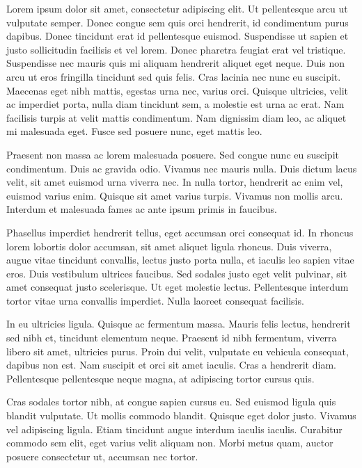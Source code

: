 \newpage
Lorem ipsum dolor sit amet, consectetur adipiscing elit. Ut
pellentesque arcu ut vulputate semper. Donec congue sem quis orci
hendrerit, id condimentum purus dapibus. Donec tincidunt erat id
pellentesque euismod. Suspendisse ut sapien et justo sollicitudin
facilisis et vel lorem. Donec pharetra feugiat erat vel
tristique. Suspendisse nec mauris quis mi aliquam hendrerit aliquet
eget neque. Duis non arcu ut eros fringilla tincidunt sed quis
felis. Cras lacinia nec nunc eu suscipit. Maecenas eget nibh mattis,
egestas urna nec, varius orci. Quisque ultricies, velit ac imperdiet
porta, nulla diam tincidunt sem, a molestie est urna ac erat. Nam
facilisis turpis at velit mattis condimentum. Nam dignissim diam leo,
ac aliquet mi malesuada eget. Fusce sed posuere nunc, eget mattis leo.

Praesent non massa ac lorem malesuada posuere. Sed congue nunc eu
suscipit condimentum. Duis ac gravida odio. Vivamus nec mauris
nulla. Duis dictum lacus velit, sit amet euismod urna viverra nec. In
nulla tortor, hendrerit ac enim vel, euismod varius enim. Quisque sit
amet varius turpis. Vivamus non mollis arcu. Interdum et malesuada
fames ac ante ipsum primis in faucibus.

Phasellus imperdiet hendrerit tellus, eget accumsan orci consequat
id. In rhoncus lorem lobortis dolor accumsan, sit amet aliquet ligula
rhoncus. Duis viverra, augue vitae tincidunt convallis, lectus justo
porta nulla, et iaculis leo sapien vitae eros. Duis vestibulum
ultrices faucibus. Sed sodales justo eget velit pulvinar, sit amet
consequat justo scelerisque. Ut eget molestie lectus. Pellentesque
interdum tortor vitae urna convallis imperdiet. Nulla laoreet
consequat facilisis.

In eu ultricies ligula. Quisque ac fermentum massa. Mauris felis
lectus, hendrerit sed nibh et, tincidunt elementum neque. Praesent id
nibh fermentum, viverra libero sit amet, ultricies purus. Proin dui
velit, vulputate eu vehicula consequat, dapibus non est. Nam suscipit
et orci sit amet iaculis. Cras a hendrerit diam. Pellentesque
pellentesque neque magna, at adipiscing tortor cursus quis.

Cras sodales tortor nibh, at congue sapien cursus eu. Sed euismod
ligula quis blandit vulputate. Ut mollis commodo blandit. Quisque eget
dolor justo. Vivamus vel adipiscing ligula. Etiam tincidunt augue
interdum iaculis iaculis. Curabitur commodo sem elit, eget varius
velit aliquam non. Morbi metus quam, auctor posuere consectetur ut,
accumsan nec tortor.

